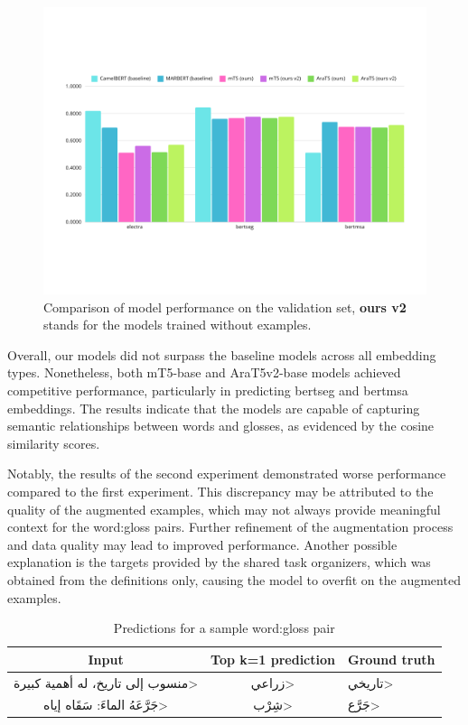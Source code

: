 \documentclass[12pt]{article}
\begin{document}
\begin{figure}[H]
    \centering
    \captionsetup{justification=centering}
    \includegraphics[width=\textwidth]{results-chart.png}
    \caption{Comparison of model performance on the validation set, \textbf{ours v2} stands for the models trained without examples.}
    \label{fig:results-chart}
\end{figure}

Overall, our models did not surpass the baseline models across all embedding types. Nonetheless, both mT5-base and AraT5v2-base models achieved competitive performance, particularly in predicting bertseg and bertmsa embeddings. The results indicate that the models are capable of capturing semantic relationships between words and glosses, as evidenced by the cosine similarity scores.

Notably, the results of the second experiment demonstrated worse performance compared to the first experiment. This discrepancy may be attributed to the quality of the augmented examples, which may not always provide meaningful context for the word:gloss pairs. Further refinement of the augmentation process and data quality may lead to improved performance. Another possible explanation is the targets provided by the shared task organizers, which was obtained from the definitions only, causing the model to overfit on the augmented examples.

\begin{table}[H]
    \centering
    \caption{Predictions for a sample word:gloss pair}
    \label{table:results-sample}
    \renewcommand{\arraystretch}{1.5}%
    \begin{tabularx}{\textwidth}{|c|c|>{\centering\arraybackslash}X|}
        \hline
        \textbf{Input} & \textbf{Top k=1 prediction} & \textbf{Ground truth} \\
        \hline
        \<منسوب إلى تاريخ، له أهمية كبيرة> & \<زراعي> & \<تاريخي> \\
        \hline
        \<جَرَّعَهُ الماءَ: سَقَاه إياه> & \<شِرْب> & \<جَرَّع> \\
        \hline
    \end{tabularx}
\end{table}
\end{document}
